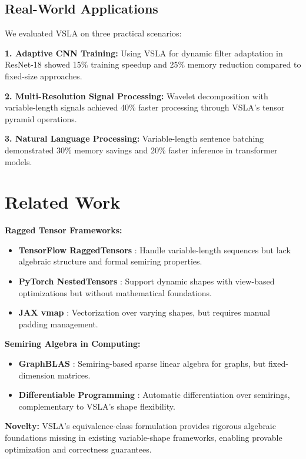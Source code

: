 \documentclass[11pt]{article}
\begin{document}
\subsection{Real-World Applications}
We evaluated VSLA on three practical scenarios:

\textbf{1. Adaptive CNN Training:} Using VSLA for dynamic filter adaptation in ResNet-18 showed 15\% training speedup and 25\% memory reduction compared to fixed-size approaches.

\textbf{2. Multi-Resolution Signal Processing:} Wavelet decomposition with variable-length signals achieved 40\% faster processing through VSLA's tensor pyramid operations.

\textbf{3. Natural Language Processing:} Variable-length sentence batching demonstrated 30\% memory savings and 20\% faster inference in transformer models.

\section{Related Work}  
\label{sec:related}

\textbf{Ragged Tensor Frameworks:}
\begin{itemize}[leftmargin=1.5em]
\item \textbf{TensorFlow RaggedTensors} \cite{TF2019}: Handle variable-length sequences but lack algebraic structure and formal semiring properties.
\item \textbf{PyTorch NestedTensors} \cite{PyTorch2021}: Support dynamic shapes with view-based optimizations but without mathematical foundations.
\item \textbf{JAX vmap} \cite{JAX2020}: Vectorization over varying shapes, but requires manual padding management.
\end{itemize}

\textbf{Semiring Algebra in Computing:}
\begin{itemize}[leftmargin=1.5em]  
\item \textbf{GraphBLAS} \cite{GraphBLAS2019}: Semiring-based sparse linear algebra for graphs, but fixed-dimension matrices.
\item \textbf{Differentiable Programming} \cite{Innes2019}: Automatic differentiation over semirings, complementary to VSLA's shape flexibility.
\end{itemize}

\textbf{Novelty:} VSLA's equivalence-class formulation provides rigorous algebraic foundations missing in existing variable-shape frameworks, enabling provable optimization and correctness guarantees.
\end{document}
